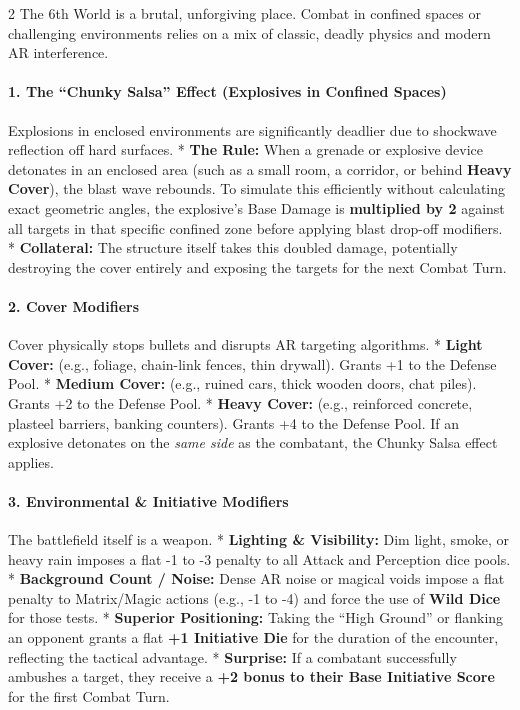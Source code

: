 \documentclass[
  oneside]{article}
\begin{document}
\begin{multicols}{2}
The 6th World is a brutal, unforgiving place.
Combat in confined spaces or challenging
environments relies on a mix of classic, deadly
physics and modern AR interference.

\hypertarget{the-chunky-salsa-effect-explosives-in-confined-spaces}{%
\paragraph{1. The ``Chunky Salsa'' Effect
(Explosives in Confined
Spaces)}\label{the-chunky-salsa-effect-explosives-in-confined-spaces}}

Explosions in enclosed environments are
significantly deadlier due to shockwave reflection
off hard surfaces. * \textbf{The Rule:} When a
grenade or explosive device detonates in an
enclosed area (such as a small room, a corridor,
or behind \textbf{Heavy Cover}), the blast wave
rebounds. To simulate this efficiently without
calculating exact geometric angles, the
explosive's Base Damage is \textbf{multiplied by
2} against all targets in that specific confined
zone before applying blast drop-off modifiers. *
\textbf{Collateral:} The structure itself takes
this doubled damage, potentially destroying the
cover entirely and exposing the targets for the
next Combat Turn.

\hypertarget{cover-modifiers}{%
\paragraph{2. Cover
Modifiers}\label{cover-modifiers}}

Cover physically stops bullets and disrupts AR
targeting algorithms. * \textbf{Light Cover:}
(e.g., foliage, chain-link fences, thin drywall).
Grants +1 to the Defense Pool. * \textbf{Medium
Cover:} (e.g., ruined cars, thick wooden doors,
chat piles). Grants +2 to the Defense Pool. *
\textbf{Heavy Cover:} (e.g., reinforced concrete,
plasteel barriers, banking counters). Grants +4 to
the Defense Pool. If an explosive detonates on the
\emph{same side} as the combatant, the Chunky
Salsa effect applies.

\hypertarget{environmental-initiative-modifiers}{%
\paragraph{3. Environmental \& Initiative
Modifiers}\label{environmental-initiative-modifiers}}

The battlefield itself is a weapon. *
\textbf{Lighting \& Visibility:} Dim light, smoke,
or heavy rain imposes a flat -1 to -3 penalty to
all Attack and Perception dice pools. *
\textbf{Background Count / Noise:} Dense AR noise
or magical voids impose a flat penalty to
Matrix/Magic actions (e.g., -1 to -4) and force
the use of \textbf{Wild Dice} for those tests. *
\textbf{Superior Positioning:} Taking the ``High
Ground'' or flanking an opponent grants a flat
\textbf{+1 Initiative Die} for the duration of the
encounter, reflecting the tactical advantage. *
\textbf{Surprise:} If a combatant successfully
ambushes a target, they receive a \textbf{+2 bonus
to their Base Initiative Score} for the first
Combat Turn.

\end{multicols}
\end{document}
